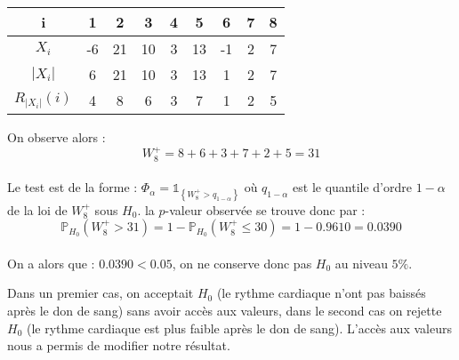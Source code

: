 \documentclass[a4paper,10pt]{report}
\begin{document}
\begin{table}[h!]
\centering
\begin{tabular}{|c|c|c|c|c|c|c|c|c|}
\hline
i              & 1 & 2 & 3 & 4 & 5 & 6 & 7 & 8 \\ \hline
$X_i$      &  -6 &  21 & 10  & 3  & 13  & -1  & 2  & 7  \\ \hline
$|X_i|$    & 6  & 21  &  10 & 3  & 13  & 1  & 2  & 7  \\ \hline
$R_{|X_i|}(i)$ &  4 &  8 & 6  &  3 &  7 &  1 & 2  &  5 \\ \hline
\end{tabular}
\end{table}

On observe alors :
$$
W_8^{+} = 8 + 6 + 3 + 7 + 2 + 5 = 31
$$ \\

Le test est de la forme : $\Phi_\alpha = \mathds{1}_{\left\{   W_8^{+} > q_{1-\alpha}  \right\}}$ où $q_{1-\alpha}$ est le quantile d'ordre $1-\alpha$ de la loi de $W_8^{+}$ sous $H_0$. la $p$-valeur observée se trouve donc par :
$$
\mathbb{P}_{H_0}(W_8^{+} > 31) = 1 - \mathbb{P}_{H_0}(W_8^{+} \leq 30) = 1 - 0.9610 = 0.0390
$$\\
On a alors que : $0.0390 < 0.05$, on ne conserve donc pas $H_0$ au niveau $5\%$.

Dans un premier cas, on acceptait $H_0$ (le rythme cardiaque n'ont pas baissés après le don de sang) sans avoir accès aux valeurs, dans le second cas on rejette $H_0$ (le rythme cardiaque est plus faible après le don de sang). L'accès aux valeurs nous a permis de modifier notre résultat.
\end{document}
